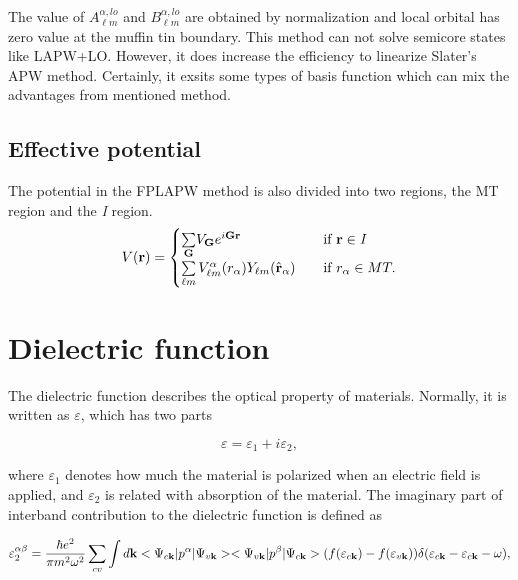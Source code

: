 \documentclass[a4paper, 12pt, titlepage,oneside,drop]{kthesis}
\begin{document}
The value of $A _{{\ell}m}^{\alpha,lo}$ and $B _{{\ell}m}^{\alpha,lo}$ are obtained by normalization and local orbital has zero value at the muffin tin boundary. This method can not solve semicore states like LAPW+LO.
However, it does increase the efficiency to linearize Slater's APW method. Certainly, it exsits some types of basis function which can mix the advantages from mentioned method.

\subsection{Effective potential}

\label{epote}
The potential in the FPLAPW method is also divided into two regions, the MT region and the \textit{I} region.
\begin{equation*}\label{lap7}
V(\textbf{r}) = 
\begin{cases} \sumg<{\textbf G}> V_{\textbf G} e^{i {\textbf G} {\textbf {r}  }} & \quad \mbox{if $\textbf{r} \in \textit{I} $}
\\
 \sum\limits_{{\ell}m} V_{{\ell}m}^{\alpha} (r_{\alpha}) Y_{{\ell}m}(\hat{{\textbf r}}_{\alpha})  & \quad \mbox{if $r_{\alpha} \in MT. $}\\ 
\end{cases}
\end{equation*}

\section{Dielectric function}
The dielectric function describes the optical property of materials. Normally, it is written as $\varepsilon$, which has two parts

\begin{equation}
 \varepsilon = \varepsilon_1 + i \varepsilon_2,
\end{equation}

where $\varepsilon_1$ denotes how much the material is polarized when an electric field is applied, and $\varepsilon_2$ is related with absorption of the material. The imaginary part of interband contribution to the dielectric function is defined as

\begin{equation}\label{df2}
\varepsilon_2^{\alpha\beta} = \frac{\hbar e^2}{\pi m^2\omega^2} \sum_{cv} \int d \textbf {k} <\Psi_{c{\textbf k}}|p^\alpha|\Psi_{v{\textbf k}}><\Psi_{v{\textbf k}}|p^\beta|\Psi_{c{\textbf k}}> (f(\varepsilon_{c \textbf k})-f(\varepsilon_{v \textbf k}))\delta(\varepsilon_{c {\textbf k}}-\varepsilon_{c{\textbf k}}-\omega),
\end{equation}
\end{document}
